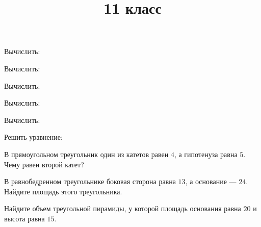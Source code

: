 \title{11 класс}
\begin{listofex}
	\item Вычислить:
	\begin{enumcols}[itemcolumns=3]
		\item {}
		\item {}
		\item {}
		\item {}
	\end{enumcols}
	\item Вычислить:
	\begin{enumcols}[itemcolumns=3]
		\item {}
		\item {}
		\item {}
		\item {}
		\item {}
	\end{enumcols}
	\item Вычислить:
	\begin{enumcols}[itemcolumns=3]
		\item {}
		\item {}
		\item {}
		\item {}
		\item {}
	\end{enumcols}
	\item Вычислить:
	\begin{enumcols}[itemcolumns=3]
		\item {}
		\item {}
		\item {}
	\end{enumcols}
	\item Вычислить:
	\begin{enumcols}[itemcolumns=2]
		\item {}
		\item {}
	\end{enumcols}
	\item Решить уравнение:
	\begin{enumcols}[itemcolumns=4]
		\item {}
		\item {}
		\item {}
		\item {}
	\end{enumcols}
	\item В прямоугольном треугольник один из катетов равен \( 4 \), а гипотенуза равна \( 5 \). Чему равен второй катет?
	\item В равнобедренном треугольнике боковая сторона равна \( 13 \), а основание --- \( 24 \). Найдите площадь этого треугольника.
	\item Найдите объем треугольной пирамиды, у которой площадь основания равна \( 20 \) и высота равна \( 15 \).
\end{listofex}